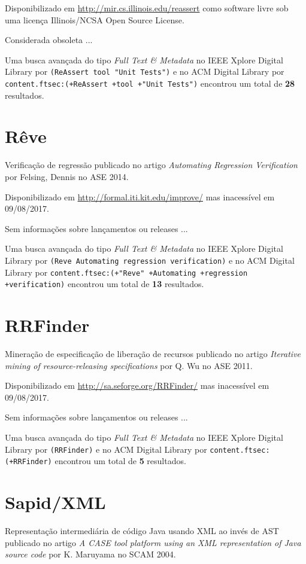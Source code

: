 Disponibilizado em \url{http://mir.cs.illinois.edu/reassert}
como software livre
sob uma licença Illinois/NCSA Open Source License.

Considerada obsoleta ...


Uma busca avançada do tipo {\it Full Text \& Metadata} no IEEE Xplore Digital Library por
\texttt{(ReAssert tool "Unit Tests")}
e no ACM Digital Library por
\texttt{content.ftsec:(+ReAssert +tool +"Unit Tests")}
encontrou um total de
{\bf 28}
resultados.

\section{Rêve}

Verificação de regressão
publicado no artigo {\it Automating Regression Verification}
por Felsing, Dennis
no ASE 2014.

Disponibilizado em \url{http://formal.iti.kit.edu/improve/}
mas inacessível em 09/08/2017.

Sem informações sobre lançamentos ou releases ...


Uma busca avançada do tipo {\it Full Text \& Metadata} no IEEE Xplore Digital Library por
\texttt{(Reve Automating regression verification)}
e no ACM Digital Library por
\texttt{content.ftsec:(+"Reve" +Automating +regression +verification)}
encontrou um total de
{\bf 13}
resultados.

\section{RRFinder}

Mineração de especificação de liberação de recursos
publicado no artigo {\it Iterative mining of resource-releasing specifications}
por Q. Wu
no ASE 2011.

Disponibilizado em \url{http://sa.seforge.org/RRFinder/}
mas inacessível em 09/08/2017.

Sem informações sobre lançamentos ou releases ...


Uma busca avançada do tipo {\it Full Text \& Metadata} no IEEE Xplore Digital Library por
\texttt{(RRFinder)}
e no ACM Digital Library por
\texttt{content.ftsec:(+RRFinder)}
encontrou um total de
{\bf 5}
resultados.

\section{Sapid/XML}

Representação intermediária de código Java usando XML ao invés de AST
publicado no artigo {\it A CASE tool platform using an XML representation of Java source code}
por K. Maruyama
no SCAM 2004.


